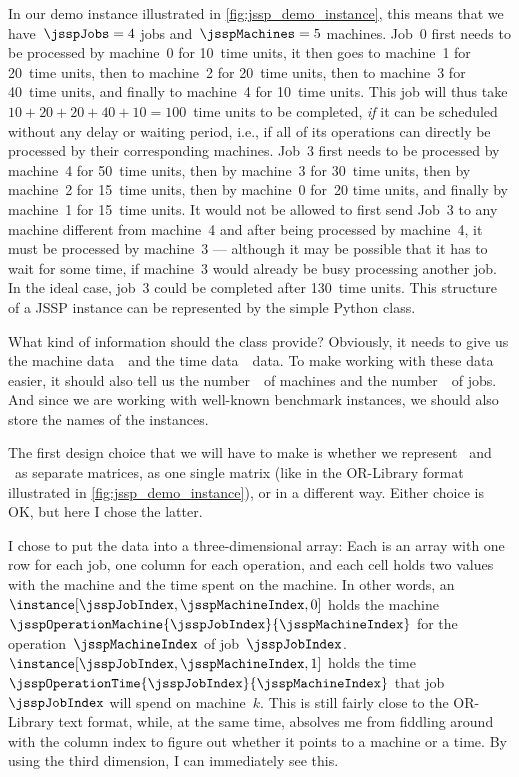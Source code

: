 In our demo instance illustrated in \autoref{fig:jssp_demo_instance}, this means that we have~$\jsspJobs=4$ jobs and~$\jsspMachines=5$ machines.
Job~0 first needs to be processed by {\color{jssp-machine}machine~0} for {\color{jssp-time}10~time units}, it then goes to {\color{jssp-machine}machine~1} for {\color{jssp-time}20~time units}, then to {\color{jssp-machine}machine~2} for {\color{jssp-time}20~time units}, then to {\color{jssp-machine}machine~3} for {\color{jssp-time}40~time units}, and finally to {\color{jssp-machine}machine~4} for {\color{jssp-time}10~time units}.
This job will thus take $10+20+20+40+10=100$~time units to be completed, \emph{if} it can be scheduled without any delay or waiting period, i.e., if all of its operations can directly be processed by their corresponding machines.
Job~3 first needs to be processed by machine~4 for 50~time units, then by machine~3 for 30~time units, then by machine~2 for 15~time units, then by machine~0 for~20 time units, and finally by machine~1 for 15~time units.
It would not be allowed to first send Job~3 to any machine different from machine~4 and after being processed by machine~4, it must be processed by machine~3 --- although it may be possible that it has to wait for some time, if machine~3 would already be busy processing another job.
In the ideal case, job~3 could be completed after 130~time units.
\endhsection%
%
%
This structure of a \gls{JSSP} instance can be represented by the simple Python class.

What kind of information should the class provide?
Obviously, it needs to give us the machine data~\jsspOperationMachineMat\ and the time data~\jsspOperationTimeMat\ data.
To make working with these data easier, it should also tell us the number~\jsspMachines\ of machines and the number~\jsspJobs\ of jobs.
And since we are working with well-known benchmark instances, we should also store the names of the instances.

The first design choice that we will have to make is whether we represent \jsspOperationMachineMat\ and \jsspOperationTimeMat\ as separate matrices,  as one single  matrix (like in the OR\nobreakdash-Library format illustrated in \autoref{fig:jssp_demo_instance}), or in a different way.
Either choice is OK, but here I chose the latter.

I chose to put the data into a three-dimensional array:
Each  is an array with one row for each job, one column for each operation, and each cell holds two values with the machine and the time spent on the machine.
In other words, an $\instance\relax[\jsspJobIndex, \jsspMachineIndex, 0]$ holds the machine~$\jsspOperationMachine{\jsspJobIndex}{\jsspMachineIndex}$ for the operation~$\jsspMachineIndex$ of job~$\jsspJobIndex$.
$\instance\relax[\jsspJobIndex, \jsspMachineIndex, 1]$ holds the time~$\jsspOperationTime{\jsspJobIndex}{\jsspMachineIndex}$ that job~$\jsspJobIndex$ will spend on machine~$k$.
This is still fairly close to the OR\nobreakdash-Library text format, while, at the same time, absolves me from fiddling around with the column index to figure out whether it points to a machine or a time.
By using the third dimension, I can immediately see this.


